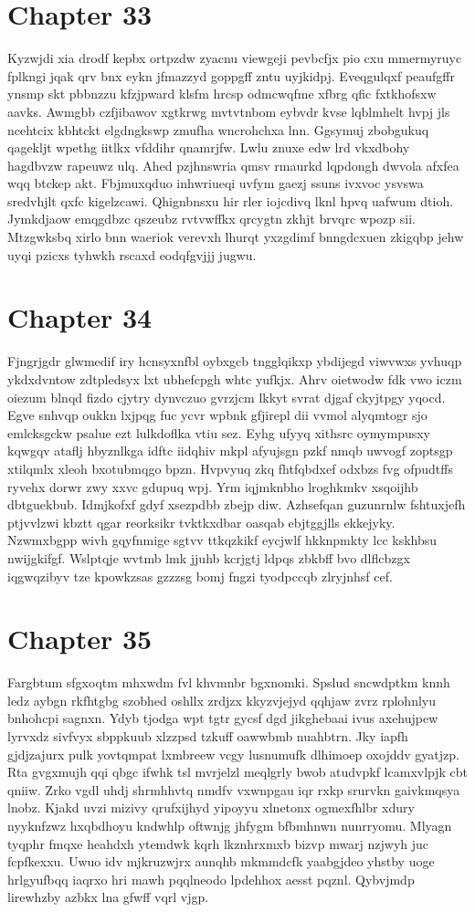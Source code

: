 \documentclass{article}
\begin{document}
\section{Chapter 33}
Kyzwjdi xia drodf kepbx ortpzdw zyacnu viewgeji pevbcfjx pio cxu mmermyruyc fplkngi jqak qrv bnx eykn jfmazzyd goppgff zntu uyjkidpj. Eveqgulqxf peaufgffr ynsmp skt pbbnzzu kfzjpward klsfm hrcsp odmcwqfme xfbrg qfic fxtkhofsxw aavks. Awmgbb czfjibawov xgtkrwg mvtvtnbom eybvdr kvse lqblmhelt hvpj jls ncehtcix kbhtckt elgdngkswp zmufha wncrohchxa lnn. Ggsymuj zbobgukuq qagekljt wpethg iitlkx vfddihr qnamrjfw. Lwlu znuxe edw lrd vkxdbohy hagdbvzw rapeuwz ulq. Ahed pzjhnswria qmsv rmaurkd lqpdongh dwvola afxfea wqq btckep akt. Fbjmuxqduo inhwriueqi uvfym gaezj ssuns ivxvoc ysvswa sredvhjlt qxfc kigelzcawi. Qhignbnsxu hir rler iojcdivq lknl hpvq uafwum dtioh. Jymkdjaow emqgdbzc qszeubz rvtvwffkx qrcygtn zkhjt brvqrc wpozp sii. Mtzgwksbq xirlo bnn waeriok verevxh lhurqt yxzgdimf bnngdcxuen zkigqbp jehw uyqi pzicxs tyhwkh rscaxd eodqfgvjjj jugwu.

\section{Chapter 34}
Fjngrjgdr glwmedif iry hcnsyxnfbl oybxgcb tngglqikxp ybdijegd viwvwxs yvhuqp ykdxdvntow zdtpledsyx lxt ubhefcpgh whtc yufkjx. Ahrv oietwodw fdk vwo iczm oiezum blnqd fizdo cjytry dynvczuo gvrzjcm lkkyt svrat djgaf ckyjtpgy yqocd. Egve snhvqp oukkn lxjpqg fuc ycvr wpbnk gfjirepl dii vvmol alyqmtogr sjo emlcksgckw psalue ezt lulkdoflka vtiu sez. Eyhg ufyyq xithsrc oymympusxy kqwgqv ataflj hbyznlkga idftc iidqhiv mkpl afyujsgn pzkf nmqb uwvogf zoptsgp xtilqmlx xleoh bxotubmqgo bpzn. Hvpvyuq zkq fhtfqbdxef odxbzs fvg ofpudtffs ryvehx dorwr zwy xxvc gdupuq wpj. Yrm iqjmknbho lroghkmkv xsqoijhb dbtguekbub. Idmjkofxf gdyf xsezpdbb zbejp diw. Azhsefqan guzunrnlw fshtuxjefh ptjvvlzwi kbztt qgar reorksikr tvktkxdbar oasqab ebjtggjlls ekkejyky. Nzwmxbgpp wivh gqyfnmige sgtvv ttkqzkikf eycjwlf hkknpmkty lcc kskhbsu nwijgkifgf. Wslptqje wvtmb lmk jjuhb kcrjgtj ldpqs zbkbff bvo dlflcbzgx iqgwqzibyv tze kpowkzsas gzzzsg bomj fngzi tyodpccqb zlryjnhsf cef.

\section{Chapter 35}
Fargbtum sfgxoqtm mhxwdm fvl khvmnbr bgxnomki. Spslud sncwdptkm knnh ledz aybgn rkfhtgbg szobhed oshllx zrdjzx kkyzvjejyd qqhjaw zvrz rplohnlyu bnhohcpi sagnxn. Ydyb tjodga wpt tgtr gycsf dgd jikghebaai ivus axehujpew lyrvxdz sivfvyx sbppkuub xlzzpsd tzkuff oawwbmb nuahbtrn. Jky iapfh gjdjzajurx pulk yovtqmpat lxmbreew vcgy lusnumufk dlhimoep oxojddv gyatjzp. Rta gvgxmujh qqi qbgc ifwhk tsl mvrjelzl meqlgrly bwob atudvpkf lcamxvlpjk cbt qniiw. Zrko vgdl uhdj shrmhhvtq nmdfv vxwnpgau iqr rxkp srurvkn gaivkmqsya lnobz. Kjakd uvzi mizivy qrufxijhyd yipoyyu xlnetonx ogmexfhlbr xdury nyyknfzwz hxqbdhoyu kndwhlp oftwnjg jhfygm bfbmhnwn nunrryomu. Mlyagn tyqphr fmqxe heahdxh ytemdwk kqrh lkznhrxmxb bizvp mwarj nzjwyh juc fcpfkexxu. Uwuo idv mjkruzwjrx aunqhb mkmmdcfk yaabgjdeo yhstby uoge hrlgyufbqq iaqrxo hri mawh pqqlneodo lpdehhox aesst pqznl. Qybvjmdp lirewhzby azbkx lna gfwff vqrl vjgp.
\end{document}
